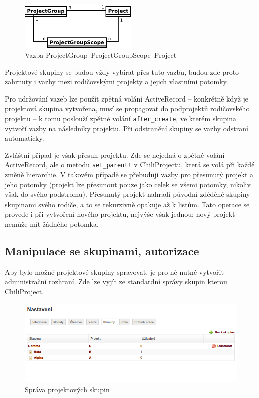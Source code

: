 \documentclass[thesis=B,czech]{FITthesis}[2012/05/02]
\begin{document}
\begin{figure}[htbp]
\centering
\includegraphics[width=0.5\textwidth]{group-er4.pdf}
\caption{Vazba ProjectGroup--ProjectGroupScope--Project}
\end{figure}

Projektové skupiny se budou vždy vybírat přes tuto vazbu, budou zde
proto zahrnuty i vazby mezi rodičovskými projekty a jejich vlastními
potomky.

Pro udržování vazeb lze použít zpětná volání ActiveRecord -- konkrétně
když je projektová skupina vytvořena, musí se propagovat do podprojektů
rodičovského projektu -- k tomu poslouží zpětné volání
\lstinline!after_create!, ve kterém skupina vytvoří vazby na následníky
projektu. Při odstranění skupiny se vazby odstraní automaticky.

Zvláštní případ je však přesun projektu. Zde se nejedná o zpětné volání
ActiveRecord, ale o metodu \lstinline"set_parent!" v ChiliProjectu,
která se volá při každé změně hierarchie. V takovém případě se přebudují
vazby pro přesunutý projekt a jeho potomky (projekt lze přesunout pouze
jako celek se všemi potomky, nikoliv však do svého podstromu). Přesunutý
projekt nahradí původní zděděné skupiny skupinami svého rodiče, a to se
rekurzivně opakuje až k listům.
Tato operace se provede i při vytvoření nového projektu, nejvýše však
jednou; nový projekt nemůže mít žádného potomka.

\subsection{Manipulace se skupinami, autorizace}

Aby bylo možné projektové skupiny spravovat, je pro ně nutné vytvořit
administrační rozhraní. Zde lze vyjít ze standardní správy skupin kterou
ChiliProject.

\begin{figure}[tbp]
\centering
\includegraphics[width=1\textwidth]{group-gui1.png}
\caption{Správa projektových skupin}
\end{figure}
\end{document}
